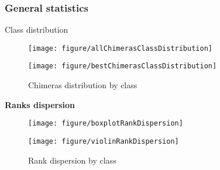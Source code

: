 \documentclass[a4paper]{article}
\begin{document}
\subsubsection{General statistics}

\large{Class distribution}\\

\begin{figure}
\begin{minipage}[b]{0.45\linewidth}
\centering

\begin{knitrout}
\color{fgcolor}

{\centering \texttt{[image: figure/allChimerasClassDistribution]} 

}



\end{knitrout}


\end{minipage}
\hspace{0.5cm}
\begin{minipage}[b]{0.45\linewidth}
\centering

\begin{knitrout}
\color{fgcolor}

{\centering \texttt{[image: figure/bestChimerasClassDistribution]} 

}



\end{knitrout}

\end{minipage}
\caption{Chimeras distribution by class}
\label{fig:chimCT_class-distribution}
\end{figure}


\large{\bf Ranks dispersion}\\

\begin{figure}
\begin{minipage}[b]{0.45\linewidth}
\centering
\begin{knitrout}
\color{fgcolor}
\texttt{[image: figure/boxplotRankDispersion]} 

\end{knitrout}

\end{minipage}
\hspace{0.5cm}
\begin{minipage}[b]{0.45\linewidth}
\centering
\begin{knitrout}
\color{fgcolor}
\texttt{[image: figure/violinRankDispersion]} 

\end{knitrout}

\end{minipage}
\caption{Rank dispersion by class}
\label{fig:chimCT_rank-dispersion}
\end{figure}
\end{document}
